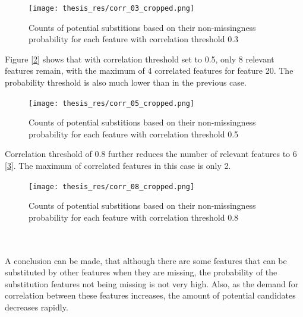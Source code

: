 \documentclass[11pt]{article}
\begin{document}
        \begin{figure}
          \centering
          \texttt{[image: thesis\_res/corr\_03\_cropped.png]}
          \caption{Counts of potential substitions based on their non-missingness probability for each feature with correlation threshold 0.3}
          \label{figure:corr_03}
        \end{figure}
        \newpage
        \noindent Figure [\ref{figure:corr_05}] shows that with correlation threshold set to 0.5, only 8 relevant features remain, with the maximum of 4 correlated features for feature 20. The probability threshold is also much lower than in the previous case.
        \begin{figure}
          \centering
          \texttt{[image: thesis\_res/corr\_05\_cropped.png]}
          \caption{Counts of potential substitions based on their non-missingness probability for each feature with correlation threshold 0.5}
          \label{figure:corr_05}
        \end{figure}
        \newpage
        \noindent Correlation threshold of 0.8 further reduces the number of relevant features to 6 [\ref{figure:corr_08}]. The maximum of correlated features in this case is only 2.
        \begin{figure}
          \centering
          \texttt{[image: thesis\_res/corr\_08\_cropped.png]}
          \caption{Counts of potential substitions based on their non-missingness probability for each feature with correlation threshold 0.8}
          \label{figure:corr_08}
        \end{figure}
        \\~\\
        \noindent A conclusion can be made, that although there are some features that can be substituted by other features when they are missing, the probability of the substitution features not being missing is not very high. Also, as the demand for correlation between these features increases, the amount of potential candidates decreases rapidly.
  \newpage
\end{document}
